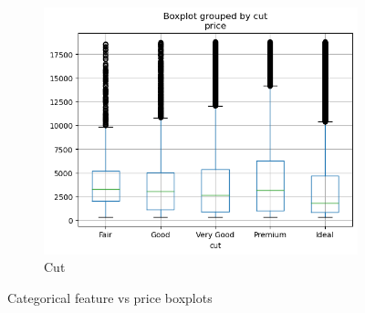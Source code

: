 \documentclass[11pt,letterpaper]{article}
\begin{document}
\begin{figure}[H]
    \hfill
    \begin{subfigure}[b]{0.3\textwidth}
        \centering
        \includegraphics[width=\textwidth]{../Figures/Question-1/cutBox.png}
        \caption{Cut}
        \label{fig:cutBox}
    \end{subfigure}
       \caption{Categorical feature vs price boxplots}
       \label{fig:boxPlots}
\end{figure}
\end{document}
